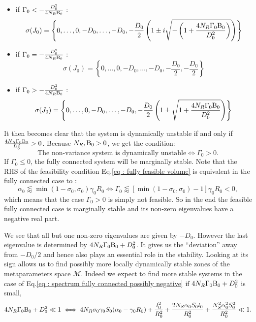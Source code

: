 \documentclass[12pt, titlepage, twoside, openright]{report}
\begin{document}
  \begin{itemize}
  \item if $\Gamma_0 < -\frac{D_0^2}{4 N_R \text{B}_0}$ :
  \begin{equation}
  \sigma(J_0)= \left\{0, \dots, 0, -D_0, \dots, -D_0, -\frac{D_0}{2} \left(1\pm i \sqrt{-\left(1+\frac{4N_R\Gamma_0\text{B}_0}{D_0^2}\right)}\right)\right\}
  \end{equation}
  \item if $\Gamma_0 = -\frac{D_0^2}{4 N_R \text{B}_0}$ :
  \begin{equation}
  \sigma(J_0)= \left\{0, \dots, 0, -D_0, \dots, -D_0, -\frac{D_0}{2}, -\frac{D_0}{2}\right\}
  \end{equation}
  \item if $\Gamma_0 > -\frac{D_0^2}{4 N_R \text{B}_0}$ :
  \begin{equation}
  \sigma(J_0)= \left\{0, \dots, 0, -D_0, \dots, -D_0, -\frac{D_0}{2} \left(1\pm \sqrt{1+\frac{4N_R\Gamma_0\text{B}_0}{D_0^2}}\right)\right\} \label{eq : spectrum fully connected possibly negative}
  \end{equation}
  \end{itemize}
  It then becomes clear that the system is dynamically unstable if and only if $\frac{4N_R\Gamma_0 \text{B}_0}{D_0^2} > 0 $. Because $N_R, \text{B}_0 > 0$, we get the condition:
  \begin{equation}
  {
  \text{The non-variance system is dynamically unstable} \iff \Gamma_0 > 0.
  }
  \end{equation}
  If $\Gamma_0 \leq 0$, the fully connected system will be marginally stable.
  Note that the RHS of the feasibility condition Eq.\eqref{eq : fully feasible volume} is equivalent in the fully connected case to :
  \begin{equation}
  \alpha_0 \lessapprox \min(1-\sigma_0, \sigma_0)\gamma_0 R_0 \iff \Gamma_0 \lessapprox \left[\min(1-\sigma_0, \sigma_0)-1\right] \gamma_0 R_0 < 0,
  \end{equation}
  which means that the case $\Gamma_0 > 0$ is simply not feasible. So in the end the feasible fully connected case is marginally stable and its non-zero eigenvalues have a negative real part.

  We see that all but one non-zero eigenvalues are given by $-D_0$. However the last eigenvalue is determined by
  $4N_R\Gamma_0\text{B}_0+D_0^2$. It gives us the ``deviation'' away from $-D_0/2$ and hence also plays an essential role in the stability. Looking at its sign allows us to find possibly more locally dynamically stable zones of the metaparameters space $\mathcal{M}$. Indeed we expect to find more stable systems in the case of Eq.\eqref{eq : spectrum fully connected possibly negative} if $4 N_R \Gamma_0 \text{B}_0 + D_0 ^2$ is small, \ie
  \begin{equation}
  4 N_R \Gamma_0 \text{B}_0 + D_0 ^2 \ll 1 \iff 4N_R \sigma_0 \gamma_0 S_0  (\alpha_0 - \gamma_0 R_0) +\frac{l_0^2}{R_0^2}+\frac{2N_S\alpha_0 S_0 l_0}{R_0^2} + \frac{N_S^2 \alpha_0^2 S_0^2}{R_0^2} \ll 1. \label{eq : change of stab eigenvalue akaksfk}
  \end{equation}
\end{document}
